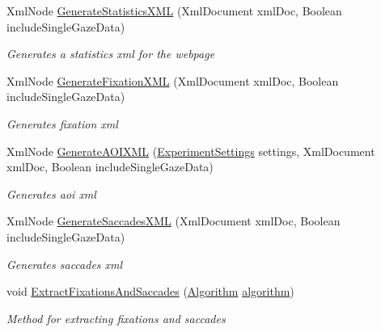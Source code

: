 \begin{DoxyCompactItemize}
Xml\+Node \hyperlink{class_web_analyzer_1_1_models_1_1_data_model_1_1_webpage_model_a32f7e53626e6dcec7a2261110456dde1}{Generate\+Statistics\+X\+M\+L} (Xml\+Document xml\+Doc, Boolean include\+Single\+Gaze\+Data)
\begin{DoxyCompactList}\small\item\em Generates a statistics xml for the webpage \end{DoxyCompactList}\item 
Xml\+Node \hyperlink{class_web_analyzer_1_1_models_1_1_data_model_1_1_webpage_model_a52e59f18909452181341e36e18bb57fb}{Generate\+Fixation\+X\+M\+L} (Xml\+Document xml\+Doc, Boolean include\+Single\+Gaze\+Data)
\begin{DoxyCompactList}\small\item\em Generates fixation xml \end{DoxyCompactList}\item 
Xml\+Node \hyperlink{class_web_analyzer_1_1_models_1_1_data_model_1_1_webpage_model_ac77dcced8299e84a47feea280c9e9dee}{Generate\+A\+O\+I\+X\+M\+L} (\hyperlink{class_web_analyzer_1_1_models_1_1_settings_model_1_1_experiment_settings}{Experiment\+Settings} settings, Xml\+Document xml\+Doc, Boolean include\+Single\+Gaze\+Data)
\begin{DoxyCompactList}\small\item\em Generates aoi xml \end{DoxyCompactList}\item 
Xml\+Node \hyperlink{class_web_analyzer_1_1_models_1_1_data_model_1_1_webpage_model_a123917bf5e44e719fb0e626615f030ab}{Generate\+Saccades\+X\+M\+L} (Xml\+Document xml\+Doc, Boolean include\+Single\+Gaze\+Data)
\begin{DoxyCompactList}\small\item\em Generates saccades xml \end{DoxyCompactList}\item 
void \hyperlink{class_web_analyzer_1_1_models_1_1_data_model_1_1_webpage_model_aebdfec61a00dd14845ee5e46bccbf268}{Extract\+Fixations\+And\+Saccades} (\hyperlink{class_web_analyzer_1_1_models_1_1_algorithm_model_1_1_algorithm}{Algorithm} \hyperlink{_u_i_2_h_t_m_l_resources_2js_2src_2analyse_8js_a1222cf9678e9ad6a699b071d3308f976}{algorithm})
\begin{DoxyCompactList}\small\item\em Method for extracting fixations and saccades \end{DoxyCompactList}\end{DoxyCompactItemize}
